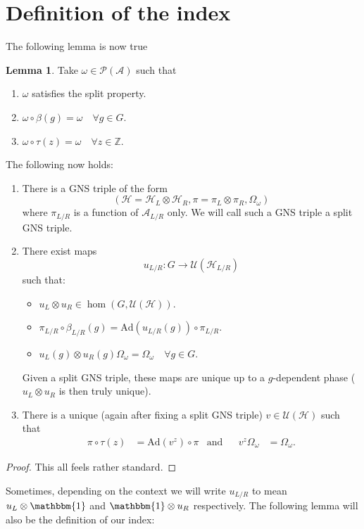\documentclass[12pt,a4paper,twoside]{article}
\newcommand{\UU}{\mathcal U}
\newcommand{\PP}{\mathcal P}
\newcommand{\HH}{\mathcal H}
\newcommand{\ZZ}{\mathbb Z}
\renewcommand{\AA}{\mathcal A}
\newcommand{\one}{\mathbbm{1}}
\newcommand{\Ad}{\textrm{Ad}}
\theoremstyle{definition}
\newtheorem{lemma}[theorem]{Lemma}
\numberwithin{equation}{section}
\begin{document}
\section{Definition of the index}
The following lemma is now true
\begin{lemma}
	Take $\omega\in\PP(\AA)$ such that
	\begin{enumerate}
		\item $\omega$ satisfies the split property.
		\item $\omega\circ\beta(g)=\omega\quad\forall g\in G$.
		\item $\omega\circ\tau(z)=\omega\quad\forall z\in\ZZ$.
	\end{enumerate}
	The following now holds:
	\begin{enumerate}
		\item There is a GNS triple of the form
		\begin{equation}
			(\HH=\HH_L\otimes\HH_R,\pi=\pi_L\otimes\pi_R,\Omega_\omega)
		\end{equation}
		where $\pi_{L/R}$ is a function of $\AA_{L/R}$ only. We will call such a GNS triple a split GNS triple.
		\item There exist maps
		\begin{equation}
			u_{L/R}:G\rightarrow\UU(\HH_{L/R})
		\end{equation}
		such that:
		\begin{itemize}
			\item $u_L\otimes u_R\in\hom(G,\UU(\HH))$.
			\item $\pi_{L/R}\circ \beta_{L/R}(g)=\Ad(u_{L/R}(g))\circ\pi_{L/R}$.
			\item $u_L(g)\otimes u_R(g)\Omega_\omega=\Omega_\omega\quad\forall g\in G$.
		\end{itemize}
		Given a split GNS triple, these maps are unique up to a $g$-dependent phase ($u_L\otimes u_R$ is then truly unique).
		\item There is a unique (again after fixing a split GNS triple) $v\in\UU(\HH)$ such that
		\begin{align}
			\pi\circ\tau(z)&=\Ad(v^z)\circ\pi&\text{and}&&v^z\Omega_\omega&=\Omega_\omega.
		\end{align}
	\end{enumerate}
\end{lemma}
\begin{proof}
	This all feels rather standard.
\end{proof}
Sometimes, depending on the context we will write $u_{L/R}$ to mean $u_L\otimes\one$ and $\one\otimes u_R$ respectively. The following lemma will also be the definition of our index:
\end{document}
